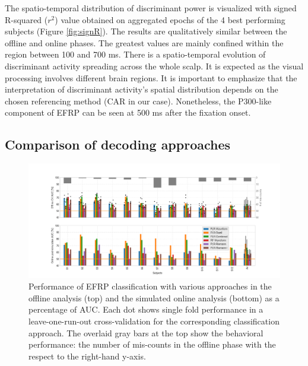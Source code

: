 \documentclass[12pt]{iopart}
\begin{document}
The spatio-temporal distribution of discriminant power is visualized 
with signed R-squared ($r^2$) value obtained on aggregated 
epochs of the 4 best performing subjects (Figure \ref{fig:signR}).
The results are qualitatively similar between the offline and online phases.
The greatest values are mainly confined within the region between 100 and 700 ms.
There is a spatio-temporal evolution of discriminant activity spreading across the whole scalp. It is expected as the visual processing involves different brain regions. It is important to emphasize that the interpretation of discriminant activity's spatial distribution depends on the chosen referencing method (CAR in our case). Nonetheless, the P300-like component of EFRP can be seen at 500 ms
after the fixation onset.



\subsection{Comparison of decoding approaches}
\label{sec:class}

\begin{figure}[!t]
\center
    \includegraphics[trim={3cm 0cm 2cm 0cm},clip,width=1.1\columnwidth]{../images/Classification12_FixDurSep.png}
    \caption{Performance of EFRP classification with various approaches in the offline analysis (top)
    and the simulated online analysis (bottom) as a percentage of AUC.
    Each dot shows single fold performance
    in a leave-one-run-out cross-validation for the corresponding classification approach.
    The overlaid gray bars at the top show the behavioral performance:
    the number of mis-counts in the offline phase with the respect to the right-hand y-axis.}
\label{fig:classAll}
\end{figure}
\end{document}
